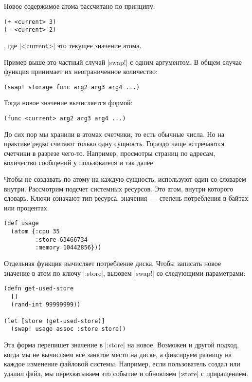 Новое содержимое атома рассчитано по принципу:

\begin{verbatim}
(+ <current> 3)
(- <current> 2)
\end{verbatim}

, где \spverb|<current>| это текущее значение атома.

Пример выше это частный случай \spverb|swap!| с одним аргументом. В общем случае
функция принимает их неограниченное количество:

\begin{verbatim}
(swap! storage func arg2 arg3 arg4 ...)
\end{verbatim}

Тогда новое значение вычисляется формой:

\begin{verbatim}
(func <current> arg2 arg3 arg4 ...)
\end{verbatim}

До сих пор мы хранили в атомах счетчики, то есть обычные числа. Но на практике
редко считают только одну сущность. Гораздо чаще встречаются счетчики в разрезе
чего-то. Например, просмотры страниц по адресам, количество сообщений у
пользователя и так далее.

Чтобы не создавать по атому на каждую сущность, используют один со словарем
внутри. Рассмотрим подсчет системных ресурсов. Это атом, внутри которого
словарь. Ключи означают тип ресурса, значения~--- степень потребления в байтах или
процентах.

\begin{verbatim}
(def usage
  (atom {:cpu 35
         :store 63466734
         :memory 10442856}))
\end{verbatim}

Отдельная функция вычисляет потребление диска. Чтобы записать новое значение в
атом по ключу \spverb|:store|, вызовем \spverb|swap!| со следующими параметрами:

\begin{verbatim}
(defn get-used-store
  []
  (rand-int 99999999))

(let [store (get-used-store)]
  (swap! usage assoc :store store))
\end{verbatim}

Эта форма перепишет значение в \spverb|:store| на новое. Возможен и другой подход,
когда мы не вычисляем все занятое место на диске, а фиксируем разницу на каждое
изменение файловой системы. Например, если пользователь создал или удалил файл,
мы перехватываем это событие и обновляем \spverb|:store| с приращением.

